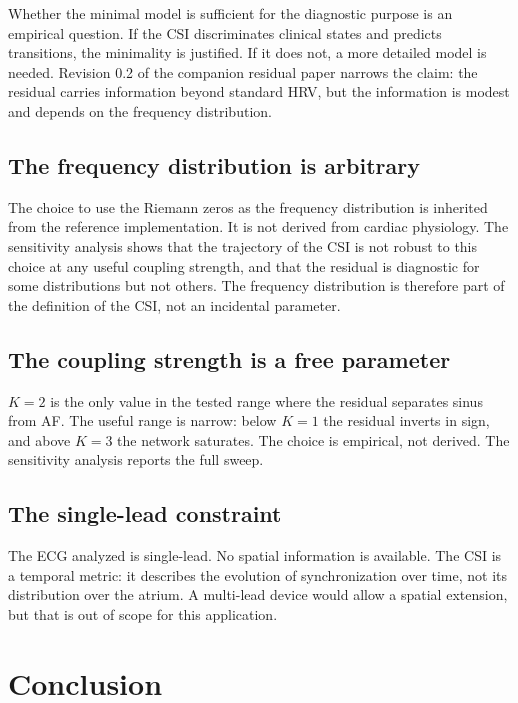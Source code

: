\documentclass[11pt]{article}
\begin{document}
Whether the minimal model is sufficient for the diagnostic purpose is an
empirical question. If the CSI discriminates clinical states and predicts
transitions, the minimality is justified. If it does not, a more detailed
model is needed. Revision 0.2 of the companion residual paper narrows
the claim: the residual carries information beyond standard HRV, but the
information is modest and depends on the frequency distribution.

\subsection{The frequency distribution is arbitrary}

The choice to use the Riemann zeros as the frequency distribution is
inherited from the reference implementation. It is not derived from
cardiac physiology. The sensitivity analysis shows that the trajectory
of the CSI is not robust to this choice at any useful coupling strength,
and that the residual is diagnostic for some distributions but not
others. The frequency distribution is therefore part of the definition
of the CSI, not an incidental parameter.

\subsection{The coupling strength is a free parameter}

$K = 2$ is the only value in the tested range where the residual
separates sinus from AF. The useful range is narrow: below $K = 1$ the
residual inverts in sign, and above $K = 3$ the network saturates. The
choice is empirical, not derived. The sensitivity analysis reports the
full sweep.

\subsection{The single-lead constraint}

The ECG analyzed is single-lead. No spatial information is available.
The CSI is a temporal metric: it describes the evolution of
synchronization over time, not its distribution over the atrium. A
multi-lead device would allow a spatial extension, but that is out of
scope for this application.

\section{Conclusion}
\end{document}
